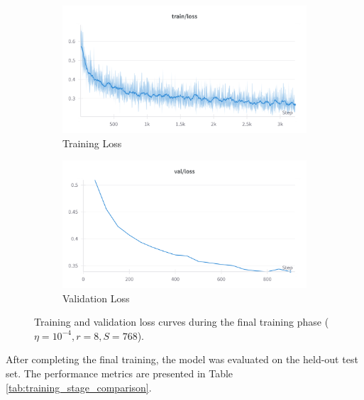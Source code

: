 \documentclass{article}
\begin{document}
\begin{figure}[!htbp] 
    \centering 
    \begin{subfigure}[b]{0.48\linewidth} 
        \centering
        \includegraphics[width=\linewidth]{M2 Course Work/Images/final_training_loss.png}
        \caption{Training Loss} %
        \label{fig:final_training_train_loss} %
    \end{subfigure}
    \hfill 
    \begin{subfigure}[b]{0.48\linewidth}
        \centering
        \includegraphics[width=\linewidth]{M2 Course Work/Images/final_validation_loss.png}
        \caption{Validation Loss} %
        \label{fig:final_training_valid_loss} %
    \end{subfigure}
    \caption{Training and validation loss curves during the final training phase ($\eta=10^{-4}, r=8, S=768$).}
    \label{fig:final_training_loss_curves} %
\end{figure}

After completing the final training, the model was evaluated on the held-out test set. The performance metrics are presented in Table \ref{tab:training_stage_comparison}.
\end{document}

